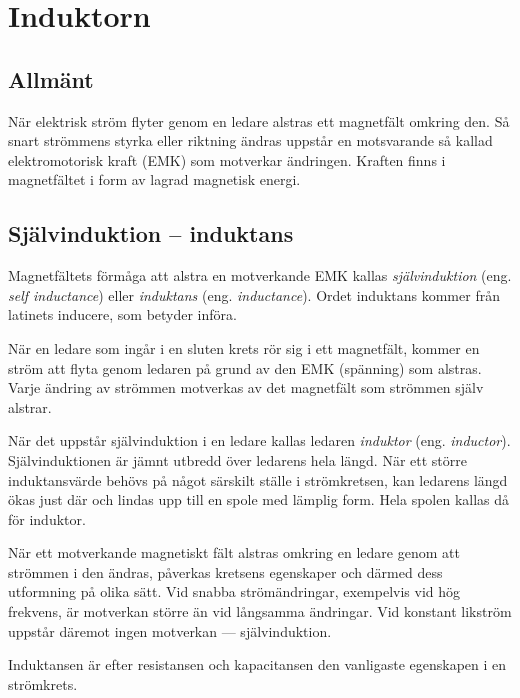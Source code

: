\section{Induktorn}

\subsection{Allmänt}
\label{induktor_allmänt}

När elektrisk ström flyter genom en ledare alstras ett magnetfält omkring
den. Så snart strömmens styrka eller riktning ändras uppstår en motsvarande
så kallad elektromotorisk kraft (EMK) som motverkar ändringen. Kraften finns i
magnetfältet i form av lagrad magnetisk energi.

\subsection{Självinduktion -- induktans}

Magnetfältets förmåga att alstra en motverkande EMK kallas
\emph{självinduktion} (eng. \emph{self inductance}) eller
\emph{induktans} (eng. \emph{inductance}).
Ordet induktans kommer från latinets inducere, som betyder införa.

När en ledare som ingår i en sluten krets rör sig i ett magnetfält, kommer
en ström att flyta genom ledaren på grund av den EMK (spänning) som alstras.
Varje ändring av strömmen motverkas av det magnetfält som strömmen själv
alstrar.

När det uppstår självinduktion i en ledare kallas ledaren \emph{induktor}
(eng. \emph{inductor}).
Självinduktionen är jämnt utbredd över ledarens hela längd. När ett större
induktansvärde behövs på något särskilt ställe i strömkretsen, kan ledarens
längd ökas just där och lindas upp till en spole med lämplig form.
Hela spolen kallas då för induktor.

När ett motverkande magnetiskt fält alstras omkring en ledare genom att strömmen 
i den ändras, påverkas kretsens egenskaper och därmed dess utformning på olika sätt.
Vid snabba strömändringar, exempelvis vid hög frekvens, är motverkan större än vid
långsamma ändringar.
Vid konstant likström uppstår däremot ingen motverkan --- självinduktion.

Induktansen är efter resistansen och kapacitansen den vanligaste egenskapen i
en strömkrets.


